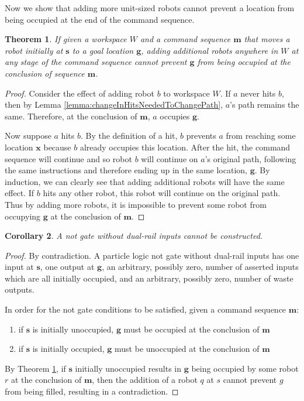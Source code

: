 \documentclass[letterpaper, 10 pt, conference]{ieeeconf}
\newtheorem{theorem}{Theorem}
\newtheorem{corollary}[theorem]{Corollary}
\begin{document}
Now we show that adding more unit-sized robots cannot prevent a location from being occupied at the end of the command sequence.

\begin{theorem}\label{thm:AdditionalRobotsCannotPreventAnOccupation}
If given a workspace $W$ and a command sequence $\bm{m}$ that moves a robot initially at $\bm{s}$ to a goal location $\bm{g}$, adding additional robots anywhere in $W$ at any stage of the command sequence cannot prevent $\bm{g}$ from being occupied at the conclusion of sequence $\bm{m}$.
\end{theorem}

\begin{proof} Consider the effect of adding robot $b$ to workspace $W$. If $a$ never hits $b$, then by Lemma \ref{lemma:changeInHitsNeededToChangePath}, $a$'s path remains the same. Therefore, at the conclusion of $\bm{m}$, $a$ occupies $\bm{g}$. 

Now suppose $a$ hits $b$. By the definition of a hit, $b$ prevents $a$ from reaching some location $\bm{x}$ because $b$ already occupies this location. After the hit, the command sequence will continue and so robot $b$ will continue on $a$'s original path, following the same instructions and therefore ending up in the same location, $\bm{g}$. By induction, we can clearly see that adding additional robots will have the same effect. If $b$ hits any other robot, this robot will continue on the original path. Thus by adding more robots, it is impossible to prevent some robot from occupying $\bm{g}$ at the conclusion of $\bm{m}$.  
\end{proof}

\begin{corollary}
A  {\sc not} gate without dual-rail inputs cannot be constructed.
\end{corollary}
\begin{proof}
By contradiction.
A particle logic {\sc not} gate without dual-rail inputs has one input at $\bm{s}$, one output at $\bm{g}$, an arbitrary, possibly zero, number of asserted inputs which are all initially occupied, and an arbitrary, possibly zero, number of waste outputs.

In order for the {\sc not} gate conditions to be satisfied, given a command sequence $\bm{m}$:  
\begin{enumerate}
\item if $\bm{s}$ is initially unoccupied, $\bm{g}$ must be occupied at the conclusion of $\bm{m}$
\item if $\bm{s}$ is initially occupied, $\bm{g}$ must be unoccupied at the conclusion of $\bm{m}$ 
\end{enumerate}
By Theorem \ref{thm:AdditionalRobotsCannotPreventAnOccupation}, if $\bm{s}$ initially unoccupied results in $\bm{g}$ being occupied by some robot $r$ at the conclusion of $\bm{m}$, then the addition of a robot $q$ at $s$ cannot prevent $g$ from being filled, resulting in a contradiction.
\end{proof}
\end{document}
